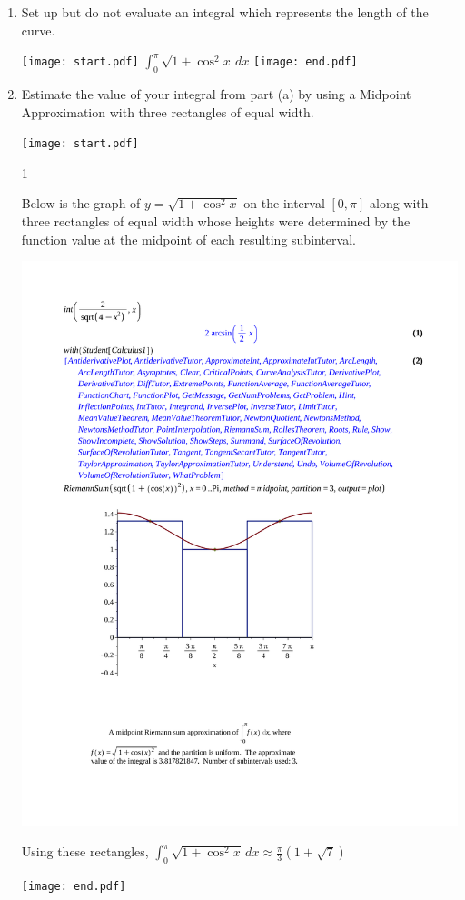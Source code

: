 \documentclass[12pt]{article}
\begin{document}
\begin{enumerate}
\begin{enumerate}
\item Set up but do not evaluate an integral which represents the length of the curve.

\texttt{[image: start.pdf]}
{{$\int_0^\pi \sqrt{1+\cos^2{x}} \,dx$}}
\texttt{[image: end.pdf]}


\item Estimate the value of your integral from part (a) by using a Midpoint Approximation with three rectangles of equal width.

\texttt{[image: start.pdf]}
{{{1\linewidth}{Below is the graph of $y=\sqrt{1+\cos^2{x}}$ on the interval $[0,\pi]$ along with three rectangles of equal width whose heights were determined by the function value at the midpoint of each resulting subinterval.\\
\begin{center}
\includegraphics[scale=0.5]{Riemann_Sum.pdf}
\end{center}
Using these rectangles, $\int_0^\pi \sqrt{1+\cos^2{x}} \,dx \approx \frac{\pi}{3}\left(1+\sqrt{7}\right)$}}}
\texttt{[image: end.pdf]}



\end{enumerate}
\end{enumerate}
\end{document}
